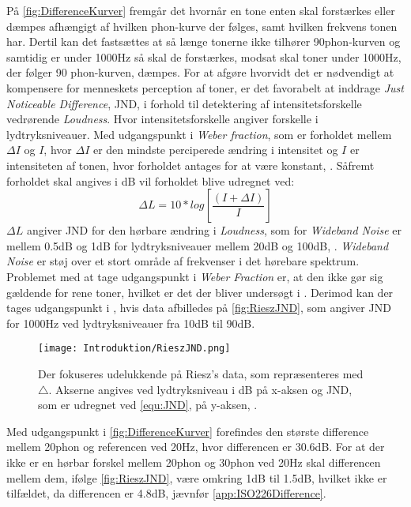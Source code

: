 \noindent
%
På \autoref{fig:DifferenceKurver} fremgår det hvornår en tone enten skal forstærkes eller dæmpes afhængigt af hvilken phon-kurve der følges, samt hvilken frekvens tonen har. Dertil kan det fastsættes at så længe tonerne ikke tilhører 90phon-kurven og samtidig er under 1000Hz så skal de forstærkes, modsat skal toner under 1000Hz, der følger 90 phon-kurven, dæmpes. For at afgøre hvorvidt det er nødvendigt at kompensere for menneskets perception af toner, er det favorabelt at inddrage \textit{Just Noticeable Difference}, JND, i forhold til detektering af intensitetsforskelle vedrørende \textit{Loudness}. Hvor intensitetsforskelle angiver forskelle i lydtryksniveauer. Med udgangspunkt i \textit{Weber fraction}, som er forholdet mellem $\Delta I$ og $I$, hvor $\Delta I$ er den mindste perciperede ændring i intensitet og $I$ er intensiteten af tonen, hvor forholdet antages for at være konstant, \parencite[s. 60]{BOOK:AnIntroductionToThePsycologyOfHearing}. Såfremt forholdet skal angives i dB vil forholdet blive udregnet ved: 
%
\noindent
\begin{equation}
	\Delta L= 10*log\left[\frac{(I+\Delta I)}{I}\right]
\label{equ:JND}
\end{equation}
\noindent
%
$\Delta L$ angiver JND for den hørbare ændring i \textit{Loudness}, som for \textit{Wideband Noise} er mellem 0.5dB og 1dB for lydtryksniveauer mellem 20dB og 100dB, \parencite[s. 60]{BOOK:AnIntroductionToThePsycologyOfHearing}. \textit{Wideband Noise} er støj over et stort område af frekvenser i det hørebare spektrum. Problemet med at tage udgangspunkt i \textit{Weber Fraction} er, at den ikke gør sig gældende for rene toner, hvilket er det der bliver undersøgt i \textcite{STD:ISO226}. Derimod kan der tages udgangspunkt i \textcite[s. 774]{PDF:OnTheRelationsOfIntensityJND}, hvis data afbilledes på \autoref{fig:RieszJND}, som angiver JND for 1000Hz ved lydtryksniveauer fra 10dB til 90dB.
%
\begin{figure}[H]
	\centering
	\texttt{[image: Introduktion/RieszJND.png]}
	\caption{Der fokuseres udelukkende på Riesz's data, som repræsenteres med $\triangle$. Akserne angives ved lydtryksniveau i dB på x-aksen og JND, som er udregnet ved \autoref{equ:JND}, på y-aksen, \parencite[s. 774]{PDF:OnTheRelationsOfIntensityJND}.}
	\label{fig:RieszJND}
\end{figure}
\noindent
%
Med udgangspunkt i \autoref{fig:DifferenceKurver} forefindes den største difference mellem 20phon og referencen ved 20Hz, hvor differencen er 30.6dB. For at der ikke er en hørbar forskel mellem 20phon og 30phon ved 20Hz skal differencen mellem dem, ifølge \autoref{fig:RieszJND}, være omkring 1dB til 1.5dB, hvilket ikke er tilfældet, da differencen er 4.8dB, jævnfør \autoref{app:ISO226Difference}. 

